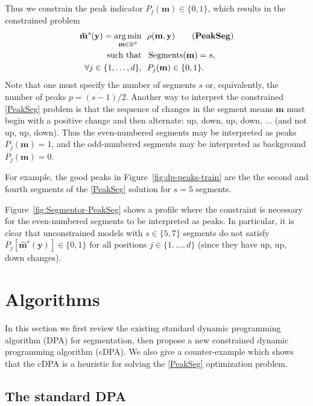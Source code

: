 \documentclass{article}
\DeclareMathOperator*{\argmin}{arg\,min}
\DeclareMathOperator*{\Segments}{Segments}
\newcommand{\RR}{\mathbb R}
\begin{document}
Thus we constrain the peak indicator $P_j(\mathbf
m)\in\{0, 1\}$, which results
in the constrained problem
\begin{align*}
  \label{PeakSeg}
  \mathbf{\tilde m}^s(\mathbf y)  =
    \argmin_{\mathbf m\in\RR^{d}} &\ \ 
    \rho(\mathbf m, \mathbf y) 
    \tag{\textbf{PeakSeg}}
\\
    \text{such that} &\ \  \Segments(\mathbf m)=s,  \\
     \forall j\in\{1, \dots, d\}, &\ \ P_j(\mathbf m) \in\{0, 1\}.
\end{align*}
Note that one must specify the number of segments $s$ or,
equivalently, the number of peaks $p=(s-1)/2$. Another way to
interpret the constrained \ref{PeakSeg} problem is that the sequence
of changes in the segment means $\mathbf m$ must begin with a positive
change and then alternate: up, down, up, down, ... (and not up, up,
down). Thus the even-numbered segments may be interpreted as peaks
$P_j(\mathbf m)=1$, and the odd-numbered segments may be interpreted
as background $P_j(\mathbf m)=0$.

For example, the good peaks in Figure~\ref{fig:dp-peaks-train} are the
the second and fourth segments of the \ref{PeakSeg} solution for $s=5$
segments.

Figure~\ref{fig:Segmentor-PeakSeg} shows a profile where the constraint is
necessary for the even-numbered segments to be interpreted as
peaks. In particular, it is clear that unconstrained models with
$s\in\{5, 7\}$ segments do not satisfy $P_j[\mathbf{\hat m}^s(\mathbf
y)]\in\{0, 1\}$ for all positions $j\in\{1,\dots, d\}$ (since they
have up, up, down changes).

\section{Algorithms}
\label{sec:algorithms}

In this section we first review the existing standard dynamic
programming algorithm (DPA) for segmentation, then propose a new
constrained dynamic programming algorithm (cDPA). We also give a
counter-example which shows that the cDPA is a heuristic for solving
the \ref{PeakSeg} optimization problem.

\subsection{The standard DPA}
\end{document}
